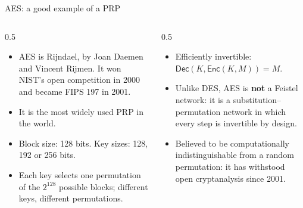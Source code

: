 \ifdefined\PRESENTATION\else\PassOptionsToClass{handout}{beamer}\fi\documentclass[aspectratio=169, lualatex]{beamer}
\begin{document}
\begin{frame}{AES: a good example of a PRP}
	\begin{columns}[c]
		\begin{column}{0.5\textwidth}
			\begin{itemize}
				\item AES is Rijndael, by Joan Daemen and Vincent Rijmen. It won NIST's open competition in 2000 and became FIPS 197 in 2001.
				\item It is the most widely used PRP in the world.
				\item Block size: 128 bits. Key sizes: 128, 192 or 256 bits.
				\item Each key selects one permutation of the $2^{128}$ possible blocks; different keys, different permutations.
			\end{itemize}
		\end{column}
		\begin{column}{0.5\textwidth}
			\begin{itemize}
				\item Efficiently invertible: $\mathsf{Dec}(K, \mathsf{Enc}(K, M)) = M$.
				\item Unlike DES, AES is \textbf{not} a Feistel network: it is a substitution--permutation network in which every step is invertible by design.
				\item Believed to be computationally indistinguishable from a random permutation: it has withstood open cryptanalysis since 2001.
			\end{itemize}
		\end{column}
	\end{columns}
\end{frame}
\end{document}
